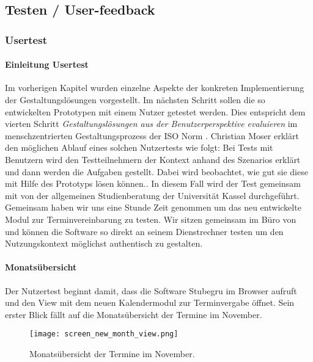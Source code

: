 \subsection{Testen / User-feedback}
\subsubsection{Usertest}

\paragraph{Einleitung Usertest}
Im vorherigen Kapitel wurden einzelne Aspekte der konkreten Implementierung der
Gestaltungslösungen vorgestellt. Im nächsten Schritt sollen die so entwickelten
Prototypen mit einem Nutzer getestet werden. Dies entspricht dem vierten
Schritt \textit{Gestaltungslösungen aus der Benutzerperspektive evaluieren} im
menschzentrierten Gestaltungsprozess der ISO Norm \cite{iso9241}. Christian
Moser erklärt den möglichen Ablauf eines solchen Nutzertests wie folgt:
\glqq{}Bei Tests mit Benutzern wird den Testteilnehmern der Kontext anhand des
Szenarios erklärt und dann werden die Aufgaben gestellt. Dabei wird beobachtet,
wie gut sie diese mit Hilfe des Prototyps lösen können.\grqq{}\cite{moserTesting}. In diesem Fall wird der Test gemeinsam mit \ipName von der allgemeinen Studienberatung der Universität Kassel durchgeführt. Gemeinsam haben wir uns eine Stunde Zeit genommen um das neu entwickelte Modul zur Terminvereinbarung zu testen. Wir sitzen gemeinsam im Büro von \ipName und können die Software so direkt an seinem Dienstrechner testen um den Nutzungskontext möglichst authentisch zu gestalten.

\paragraph{Monatsübersicht}
Der Nutzertest beginnt damit, dass \ipName die Software Stubegru im Browser
aufruft und den View mit dem neuen Kalendermodul zur Terminvergabe öffnet. Sein
erster Blick fällt auf die Monatsübersicht der Termine im November.

\begin{figure}[H]
    \caption{Monatsübersicht der Termine im November.}
    \centering
    \texttt{[image: screen\_new\_month\_view.png]}
\end{figure}

